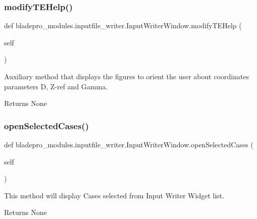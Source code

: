 \subsubsection{\texorpdfstring{modify\+T\+E\+Help()}{modifyTEHelp()}}
{\footnotesize\ttfamily def bladepro\+\_\+modules.\+inputfile\+\_\+writer.\+Input\+Writer\+Window.\+modify\+T\+E\+Help (\begin{DoxyParamCaption}\item[{}]{self }\end{DoxyParamCaption})}



Auxiliary method that displays the figures to orient the user about coordinates parameters D, Z-\/ref and Gamma. 

\begin{DoxyReturn}{Returns}
None 
\end{DoxyReturn}
\hypertarget{a00070_af311095fe10adcca5237385033dfe67b}{}\label{a00070_af311095fe10adcca5237385033dfe67b} 
\subsubsection{\texorpdfstring{open\+Selected\+Cases()}{openSelectedCases()}}
{\footnotesize\ttfamily def bladepro\+\_\+modules.\+inputfile\+\_\+writer.\+Input\+Writer\+Window.\+open\+Selected\+Cases (\begin{DoxyParamCaption}\item[{}]{self }\end{DoxyParamCaption})}



This method will display Cases selected from Input Writer Widget list. 

\begin{DoxyReturn}{Returns}
None 
\end{DoxyReturn}
\hypertarget{a00070_a61f9db1d33a2cb583c3f779a94ec700d}{}\label{a00070_a61f9db1d33a2cb583c3f779a94ec700d} 
